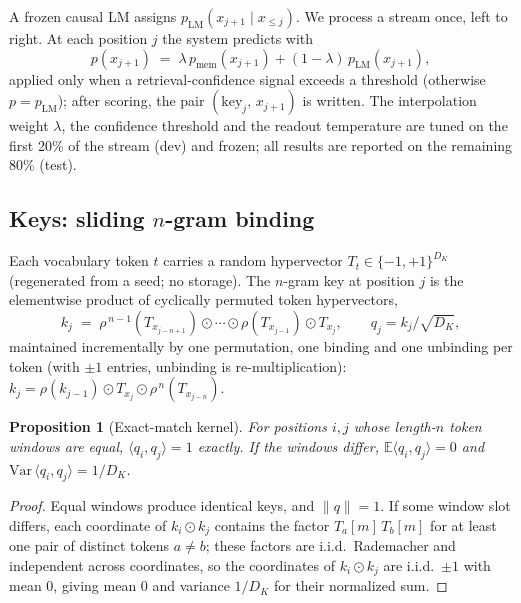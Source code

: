 \documentclass[11pt]{article}
\newtheorem{proposition}{Proposition}
\begin{document}
A frozen causal LM assigns $p_{\mathrm{LM}}(x_{j+1}\mid x_{\le j})$. We process a stream once, left to right. At each position $j$ the system predicts with
\begin{equation}
p(x_{j+1}) \;=\; \lambda\, p_{\mathrm{mem}}(x_{j+1}) + (1-\lambda)\, p_{\mathrm{LM}}(x_{j+1}),
\label{eq:mix}
\end{equation}
applied only when a retrieval-confidence signal exceeds a threshold (otherwise $p = p_{\mathrm{LM}}$); after scoring, the pair $(\text{key}_j,\, x_{j+1})$ is written. The interpolation weight $\lambda$, the confidence threshold and the readout temperature are tuned on the first 20\% of the stream (dev) and frozen; all results are reported on the remaining 80\% (test).

\subsection{Keys: sliding $n$-gram binding}\label{sec:keys}

Each vocabulary token $t$ carries a random hypervector $T_t \in \{-1,+1\}^{D_K}$ (regenerated from a seed; no storage). The $n$-gram key at position $j$ is the elementwise product of cyclically permuted token hypervectors,
\begin{equation}
k_j \;=\; \rho^{\,n-1}(T_{x_{j-n+1}}) \odot \cdots \odot \rho(T_{x_{j-1}}) \odot T_{x_j},
\qquad q_j = k_j/\sqrt{D_K},
\end{equation}
maintained incrementally by one permutation, one binding and one unbinding per token (with $\pm1$ entries, unbinding is re-multiplication): $k_j = \rho(k_{j-1}) \odot T_{x_j} \odot \rho^{\,n}(T_{x_{j-n}})$.

\begin{proposition}[Exact-match kernel]\label{prop:kernel}
For positions $i,j$ whose length-$n$ token windows are equal, $\langle q_i, q_j\rangle = 1$ exactly. If the windows differ, $\mathbb{E}\langle q_i,q_j\rangle = 0$ and $\mathrm{Var}\,\langle q_i,q_j\rangle = 1/D_K$.
\end{proposition}
\begin{proof}
Equal windows produce identical keys, and $\|q\|=1$. If some window slot differs, each coordinate of $k_i \odot k_j$ contains the factor $T_{a}[m]\,T_{b}[m]$ for at least one pair of distinct tokens $a \ne b$; these factors are i.i.d.\ Rademacher and independent across coordinates, so the coordinates of $k_i \odot k_j$ are i.i.d.\ $\pm1$ with mean $0$, giving mean $0$ and variance $1/D_K$ for their normalized sum.
\end{proof}
\end{document}

